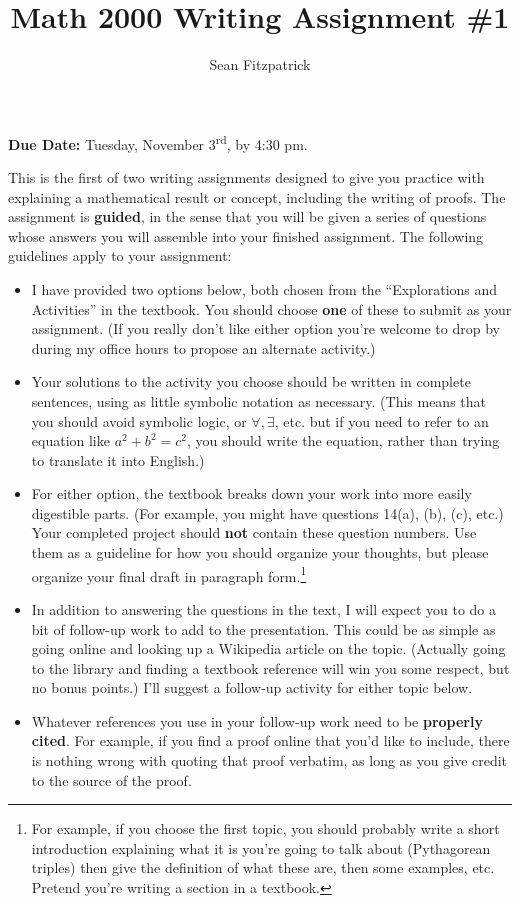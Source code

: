 \documentclass[letterpaper,12pt]{article}
\title{Math 2000 Writing Assignment \#1}
\author{Sean Fitzpatrick}
\theoremstyle{definition}
\begin{document}
 \maketitle

{\bf Due Date:} Tuesday, November 3\textsuperscript{rd}, by 4:30 pm.

\medskip

This is the first of two writing assignments designed to give you practice with explaining a mathematical result or concept, including the writing of proofs. The assignment is {\bf guided}, in the sense that you will be given a series of questions whose answers you will assemble into your finished assignment. The following guidelines apply to your assignment:
\begin{itemize}
 \item I have provided two options below, both chosen from the ``Explorations and Activities'' in the textbook. You should choose {\bf one} of these to submit as your assignment. (If you really don't like either option you're welcome to drop by during my office hours to propose an alternate activity.)
 \item Your solutions to the activity you choose should be written in complete sentences, using as little symbolic notation as necessary. (This means that you should avoid symbolic logic, or $\forall, \exists$, etc. but if you need to refer to an equation like $a^2+b^2=c^2$, you should write the equation, rather than trying to translate it into English.)
 \item For either option, the textbook breaks down your work into more easily digestible parts. (For example, you might have questions 14(a), (b), (c), etc.) Your completed project should {\bf not} contain these question numbers. Use them as a guideline for how you should organize your thoughts, but please organize your final draft in paragraph form.\footnote{For example, if you choose the first topic, you should probably write a short introduction explaining what it is you're going to talk about (Pythagorean triples) then give the definition of what these are, then some examples, etc. Pretend you're writing a section in a textbook.}
 \item In addition to answering the questions in the text, I will expect you to do a bit of follow-up work to add to the presentation. This could be as simple as going online and looking up a Wikipedia article on the topic. (Actually going to the library and finding a textbook reference will win you some respect, but no bonus points.) I'll suggest a follow-up activity for either topic below.
 \item Whatever references you use in your follow-up work need to be {\bf properly cited}. For example, if you find a proof online that you'd like to include, there is nothing wrong with quoting that proof verbatim, as long as you give credit to the source of the proof.
\end{itemize}
\end{document}
